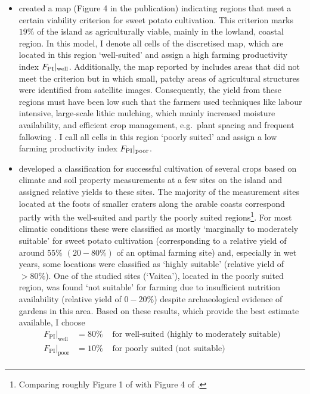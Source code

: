 \begin{itemize}
	\item \citet{Puleston2017} created a map (Figure 4 in the publication) 
	indicating regions that meet a certain viability criterion for sweet potato cultivation.
	This criterion marks $19\%$ of the island as agriculturally viable, mainly in the lowland, coastal region.
	In this model, I denote all cells of the discretised map, which are located in this region `well-suited' and assign a high farming productivity index $F_{\rm PI}|_{\rm well}$.
	Additionally, the map reported by \citet{Puleston2017} includes areas that did not meet the criterion but in which small, patchy areas of agricultural structures were identified from satellite images. 
	Consequently, the yield from these regions must have been low such that the farmers used techniques like labour intensive, large-scale lithic mulching, which mainly increased moisture availability, and efficient crop management, e.g.\ plant spacing and frequent fallowing \citep{Louwagie2006}.
	I call all cells in this region `poorly suited' and assign a low farming productivity index $F_{\rm PI}|_{\rm poor}$.
	\item \citet{Louwagie2006} developed a classification for successful cultivation of several crops based on climate and soil property measurements at a few sites on the island and assigned relative yields to these sites. 
	The majority of the measurement sites located at the foots of smaller craters along the arable coasts correspond partly with the well-suited and partly the poorly suited regions\footnote{Comparing roughly Figure 1 of \citet{Louwagie2006} with Figure 4 of \citet{Puleston2017}.}. For most climatic conditions these were classified as mostly `marginally to moderately suitable' for sweet potato cultivation (corresponding to a relative yield of around $55\%$ $(20-80\%)$ of an optimal farming site) and, especially in wet years, some locations were classified as `highly suitable' (relative yield of $>80\%$).
	One of the studied sites (`Vaitea'), located in the poorly suited region, was found `not suitable' for farming due to insufficient nutrition availability (relative yield of $0-20\%$) despite archaeological evidence of gardens in this area.
	Based on these results, which provide the best estimate available, I choose
	\begin{eqnarray*}
		F_\text{PI}|_\text{well} & = 80\% & \text{ for well-suited (highly to moderately suitable)}\\
		F_\text{PI}|_\text{poor} & = 10\%  & \text{ for poorly suited (not suitable)}\\

\end{eqnarray*}
\end{itemize}
